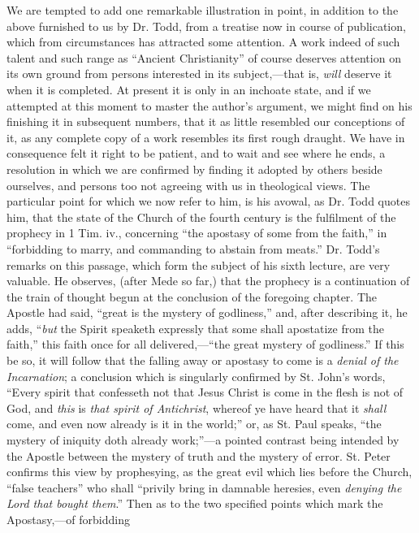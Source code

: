 We are tempted to add one remarkable illustration in point, in
addition to the above furnished to us by Dr. Todd, from a
treatise now in course of publication, which from circumstances has
attracted some attention. A work indeed of such talent and such range
as ``Ancient Christianity'' of course deserves attention on
its own ground from persons interested in its subject,—that is, \emph{will}
deserve it when it is completed. At present it is only in an inchoate
state, and if we attempted at this moment to master the author's
argument, we might find on his finishing it in subsequent numbers,
that it as little resembled our conceptions of it, as any complete
copy of a work resembles its first rough draught. We have in
consequence felt it right to be patient, and to wait and see where he
ends, a resolution in which we are confirmed by finding it adopted by
others beside ourselves, and persons too not agreeing with us in
theological views. The particular point for which we now refer to him,
is his avowal, as Dr. Todd quotes him, that the state of the Church of
the fourth century is the fulfilment of the prophecy in 1 Tim. iv.,
concerning ``the apostasy of some from the faith,'' in
``forbidding to marry, and commanding to abstain from meats.''
Dr. Todd's remarks on this passage, which form the subject of his
sixth lecture, are very valuable. He observes, (after Mede so far,)
that the prophecy is a continuation of the train of thought begun at
the conclusion of the foregoing chapter. The Apostle had said,
``great is the mystery of godliness,'' and, after describing
it, he adds, ``\emph{but} the Spirit speaketh expressly that some
shall apostatize from the faith,'' this faith once for all
delivered,—``the great mystery of godliness.'' If this be
so, it will follow that the falling away or apostasy to come is a \emph{denial
of the Incarnation}; a conclusion which is singularly confirmed by
St. John's words, ``Every spirit that confesseth not that Jesus
Christ is come in the flesh is not of God, and \emph{this} is \emph{that
spirit of Antichrist}, whereof ye have heard that it \emph{shall}
come, and even now already is it in the world;'' or, as St. Paul
speaks, ``the mystery of iniquity doth already work;''—a
pointed contrast being intended by the Apostle between the mystery of
truth and the mystery of error. St. Peter confirms this view by
prophesying, as the great evil which lies before the Church,
``false teachers'' who shall ``privily bring in damnable
heresies, even \emph{denying the Lord that bought them}.'' Then as
to the two specified points which mark the Apostasy,—of forbidding
